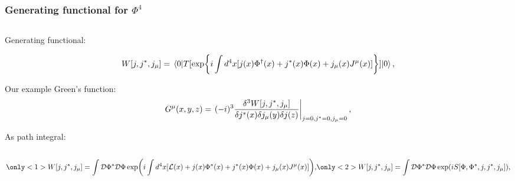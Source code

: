 \documentclass[accentcolor=tud2c,usenames,dvipsnames,colorbacktitle,inverttitle,landscape,german,presentation,t]{tudbeamer}
\begin{document}
  \begin{frame}
    \frametitle{Generating functional for $\Phi^4$}
    \begin{columns}[c]
      \begin{column}{0.8\textwidth}
        Generating functional:

        \begin{equation*}
          W[j, j^{*}, j_{\mu}] = \mel*{0}{T[\exp{i\int d^4x[j(x) \Phi^{\dagger}(x) + j^{*}(x) \Phi(x) + j_{\mu}(x) J^{\mu}(x)]}]}{0},
        \end{equation*}

        Our example Green's function:
        \begin{equation*}
          G^{\mu}(x,y,z) = \left.(-i)^3 \frac{\delta^3 W[j, j^{*}, j_{\mu}]}{\delta j^{*}(x) \delta j_{\mu}(y) \delta j(z)}\right\rvert_{j=0,j^{*}=0,j_{\mu}=0},
        \end{equation*}

        As path integral:
      \end{column}
    \end{columns}

    \begin{equation*}
      \only<1>{W[j, j^{*}, j_{\mu}] = \int \mathcal{D}\Phistar \mathcal{D}\Phi \exp(i \int d^4x[\mathcal{L}(x) + j(x) \Phi^{*} (x) + j^{*}(x) \Phi(x) + j_{\mu}(x) \Jmu(x)]),}
      \only<2>{W[j, j^{*}, j_{\mu}] = \int \mathcal{D}\Phistar \mathcal{D}\Phi \exp(i S[\Phi, \Phistar, j, j^{*}, j_{\mu}]),}
    \end{equation*}

  \end{frame}
\end{document}
